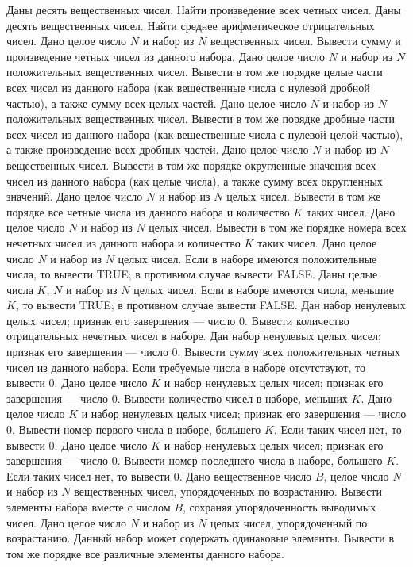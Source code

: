Даны десять вещественных чисел. Найти произведение всех четных чисел.
Даны десять вещественных чисел. Найти среднее арифметическое отрицательных чисел.
Дано целое число $N$ и набор из $N$ вещественных чисел. Вывести сумму и произведение четных чисел из данного набора.
Дано целое число $N$ и набор из $N$ положительных вещественных чисел. Вывести в том же порядке целые части всех чисел из данного набора (как вещественные числа с нулевой дробной частью), а также сумму всех целых частей.
Дано целое число $N$ и набор из $N$ положительных вещественных чисел. Вывести в том же порядке дробные части всех чисел из данного набора (как вещественные числа с нулевой целой частью), а также произведение всех дробных частей.
Дано целое число $N$ и набор из $N$ вещественных чисел. Вывести в том же порядке округленные значения всех чисел из данного набора (как целые числа), а также сумму всех округленных значений.
Дано целое число $N$ и набор из $N$ целых чисел. Вывести в том же порядке все четные числа из данного набора и количество $K$ таких чисел.
Дано целое число $N$ и набор из $N$ целых чисел. Вывести в том же порядке номера всех нечетных чисел из данного набора и количество $K$ таких чисел.
Дано целое число $N$ и набор из $N$ целых чисел. Если в наборе имеются положительные числа, то вывести TRUE; в противном случае вывести FALSE.
Даны целые числа $K$, $N$ и набор из $N$ целых чисел. Если в наборе имеются числа, меньшие $K$, то вывести TRUE; в противном случае вывести FALSE.
Дан набор ненулевых целых чисел; признак его завершения --- число $0$. Вывести количество отрицательных нечетных чисел в наборе.
Дан набор ненулевых целых чисел; признак его завершения --- число $0$. Вывести сумму всех положительных четных чисел из данного набора. Если требуемые числа в наборе отсутствуют, то вывести $0$.
Дано целое число $K$ и набор ненулевых целых чисел; признак его завершения --- число $0$. Вывести количество чисел в наборе, меньших $K$.
Дано целое число $K$ и набор ненулевых целых чисел; признак его завершения --- число $0$. Вывести номер первого числа в наборе, большего $K$. Если таких чисел нет, то вывести $0$.
Дано целое число $K$ и набор ненулевых целых чисел; признак его завершения --- число $0$. Вывести номер последнего числа в наборе, большего $K$. Если таких чисел нет, то вывести $0$.
Дано вещественное число $B$, целое число $N$ и набор из $N$ вещественных чисел, упорядоченных по возрастанию. Вывести элементы набора вместе с числом $B$, сохраняя упорядоченность выводимых чисел.
Дано целое число $N$ и набор из $N$ целых чисел, упорядоченный по возрастанию. Данный набор может содержать одинаковые элементы. Вывести в том же порядке все различные элементы данного набора.
